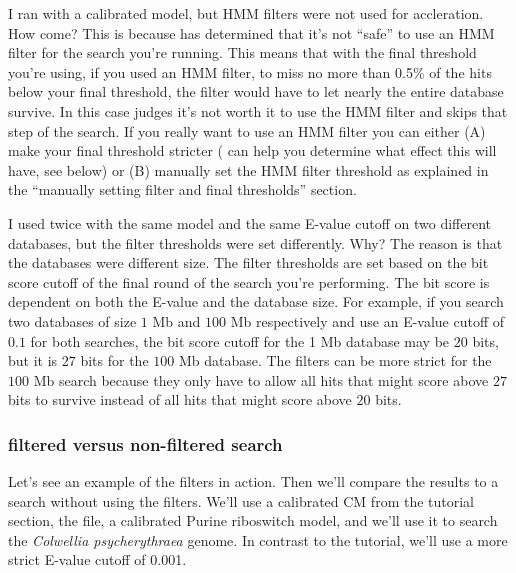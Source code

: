 \begin{srefaq}{I ran  with a calibrated model, but HMM
    filters were not used for accleration. How come?} This is because
     has determined that it's not ``safe'' to use
    an HMM filter for the search you're running. This means that with
    the final threshold you're using, if you used an HMM filter, 
    to miss no more than 0.5\% of the hits below your final threshold,
    the filter would have to let nearly the entire database
    survive. In this case  judges it's not worth it to
    use the HMM filter and skips that step of the search. If you
    really want to use an HMM filter you can either (A) make your
    final threshold stricter ( can help you determine 
    what effect this will have, see below) or (B) manually set the HMM
    filter threshold as explained in the ``manually setting filter
    and final thresholds'' section.
\end{srefaq}

\begin{srefaq}{I used  twice with the same model and
    the same E-value cutoff on two different databases, but the filter
    thresholds were set differently. Why?} The reason is that the
    databases were different size. The filter thresholds are set based
    on the bit score cutoff of the final round of the search you're
    performing. The bit score is dependent on both the E-value and the
    database size. For example, if you search two databases of size $1$
    Mb and $100$ Mb respectively and use an E-value cutoff of $0.1$ for both
    searches, the bit score cutoff for the 1 Mb database may be $20$
    bits, but it is $27$ bits for the $100$ Mb database. The filters
    can be more strict for the $100$ Mb search because they only have
    to allow all hits that might score above $27$ bits to
    survive instead of all hits that might score above $20$ bits. 
\end{srefaq}

\subsubsection{filtered versus non-filtered search}

Let's see an example of the filters in action. Then we'll compare the
results to a search without using the filters. We'll use a calibrated
CM from the tutorial section, the  file, a
calibrated Purine riboswitch model, and we'll use it to search the
\emph{Colwellia psycherythraea} genome. In contrast to the tutorial,
we'll use a more strict E-value cutoff of 0.001.

